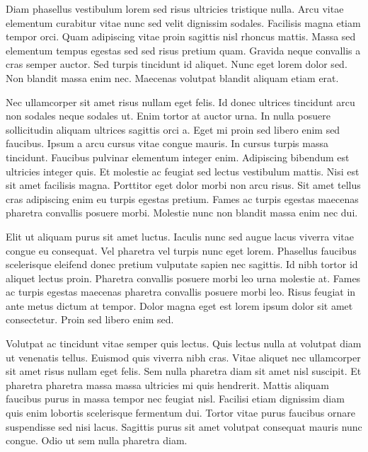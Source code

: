 Diam phasellus vestibulum lorem sed risus ultricies tristique nulla. 
Arcu vitae elementum curabitur vitae nunc sed velit dignissim sodales. 
Facilisis magna etiam tempor orci. Quam adipiscing vitae proin sagittis 
nisl rhoncus mattis. Massa sed elementum tempus egestas sed sed risus 
pretium quam. Gravida neque convallis a cras semper auctor. Sed turpis 
tincidunt id aliquet. Nunc eget lorem dolor sed. Non blandit massa enim 
nec. Maecenas volutpat blandit aliquam etiam erat.


Nec ullamcorper sit amet risus nullam eget felis. Id donec ultrices 
tincidunt arcu non sodales neque sodales ut. Enim tortor at auctor urna.
 In nulla posuere sollicitudin aliquam ultrices sagittis orci a. Eget mi
 proin sed libero enim sed faucibus. Ipsum a arcu cursus vitae congue 
mauris. In cursus turpis massa tincidunt. Faucibus pulvinar elementum 
integer enim. Adipiscing bibendum est ultricies integer quis. Et 
molestie ac feugiat sed lectus vestibulum mattis. Nisi est sit amet 
facilisis magna. Porttitor eget dolor morbi non arcu risus. Sit amet 
tellus cras adipiscing enim eu turpis egestas pretium. Fames ac turpis 
egestas maecenas pharetra convallis posuere morbi. Molestie nunc non 
blandit massa enim nec dui.


Elit ut aliquam purus sit amet luctus. Iaculis nunc sed augue lacus 
viverra vitae congue eu consequat. Vel pharetra vel turpis nunc eget 
lorem. Phasellus faucibus scelerisque eleifend donec pretium vulputate 
sapien nec sagittis. Id nibh tortor id aliquet lectus proin. Pharetra 
convallis posuere morbi leo urna molestie at. Fames ac turpis egestas 
maecenas pharetra convallis posuere morbi leo. Risus feugiat in ante 
metus dictum at tempor. Dolor magna eget est lorem ipsum dolor sit amet 
consectetur. Proin sed libero enim sed.


Volutpat ac tincidunt vitae semper quis lectus. Quis lectus nulla at 
volutpat diam ut venenatis tellus. Euismod quis viverra nibh cras. Vitae
 aliquet nec ullamcorper sit amet risus nullam eget felis. Sem nulla 
pharetra diam sit amet nisl suscipit. Et pharetra pharetra massa massa 
ultricies mi quis hendrerit. Mattis aliquam faucibus purus in massa 
tempor nec feugiat nisl. Facilisi etiam dignissim diam quis enim 
lobortis scelerisque fermentum dui. Tortor vitae purus faucibus ornare 
suspendisse sed nisi lacus. Sagittis purus sit amet volutpat consequat 
mauris nunc congue. Odio ut sem nulla pharetra diam.


